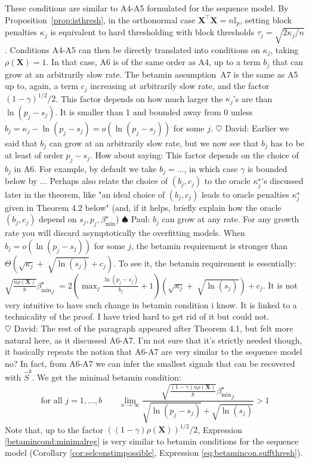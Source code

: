\documentclass[aos]{imsart}
\theoremstyle{plain}
\newcommand{\david}[1]{{\small{\color{blue} \sf $\heartsuit$ David: #1}}}
\newcommand{\paul}[1]{{\small{\color{green} \sf $\spadesuit$ Paul: #1}}}
\newcommand{\I}{\mathbb{I}}
\newcommand{\bs}{\boldsymbol}
\begin{document}
These conditions are similar to A4-A5 formulated for the sequence model.
 By Proposition~\ref{prop:isthresh}, in the orthonormal %
 case $\bs X^{\top}\bs X=n\I_p$, setting block penalties $\kappa_j$ %
 is equivalent to hard thresholding with block thresholds $\tau_j=\sqrt{2 \kappa_j/n}$.
 Conditions A4-A5 can then be directly translated into conditions on $\kappa_j$, taking $\rho(\bs X)=1$. In that case, A6 is of the same order as A4, up to a term $b_j$ that can grow at an arbitrarily slow rate. The betamin assumption~A7 is the same as A5 up to, again, a term $c_j$ increasing at arbitrarily slow rate, and the factor $(1-\gamma)^{1/2}/2$. This factor depends on how much larger the $\kappa_j$'s are than $\ln(p_j-s_j)$. It is smaller than 1 and bounded away from 0 unless $b_j= \kappa_j - \ln(p_j-s_j)= o(\ln(p_j-s_j))$ for some $j$.
\david{Earlier we said that $b_j$ can grow at an arbitrarily slow rate, but we now see that $b_j$ has to be at least of order $p_j-s_j$. How about saying: This factor depends on the choice of $b_j$ in A6. For example, by default we take $b_j=...$, in which case $\gamma$ is bounded below by ... Perhaps also relate the choice of $(b_j,c_j)$ to the oracle $\kappa_j^\star$'s discussed later in the theorem, like "an ideal choice of $(b_j,c_j)$ leads to oracle penalties $\kappa_j^\star$ given in Theorem 4.2 below" (and, if it helps, briefly explain how the oracle $(b_j,c_j)$ depend on $s_j,p_j,\beta_{\min}^\star$)} \paul{$b_j$ can grow at any rate.  For any growth rate you will discard asymptotically the overfitting models. When $b_j= o(\ln(p_j-s_j))$ for some $j$, the betamin requirement is stronger than $\Theta(\sqrt{\kappa_j} +\; \sqrt{\ln(s_j)} + c_{j})$. To see it, the betamin requirement is essentially: $\sqrt{\frac{ n\rho(\bs X)}{8}}{{\beta_{\min}^{\star}}_j}  \;=2(\max_j\frac{\ln(p_j-s_j)}{b_j}+1)(\sqrt{\kappa_j} +\; \sqrt{\ln(s_j)}) + c_{j}$. It is not very intuitive to have such change in betamin condition i know. It is linked to a technicality of the proof. I have tried hard to get rid of it but could not. \\}
\david{The rest of the paragraph appeared after Theorem 4.1, but felt more natural here, as it discussed A6-A7. I'm not sure that it's strictly needed though, it basically repeats the notion that A6-A7 are very similar to the sequence model no?} In fact, from A6-A7 we can infer the smallest signals that can be recovered with $\hat{S}^{b}$. %
We get the minimal betamin condition:
\begin{equation}\label{betamincond:minimalreg} \mbox{for all }j=1,\ldots,b \qquad
    \lim_{n\to \infty}\frac{\sqrt{\frac{(1-\gamma) n\rho(\bs X)}{8}}{\beta_{\min}^{\star}}_j}{\sqrt{\ln(p_j-s_j)} + \sqrt{\ln(s_j)}} >1
\end{equation}
Note that, up to the factor $((1-\gamma)\rho(\bs X))^{1/2}/2$, Expression \eqref{betamincond:minimalreg} is very similar to betamin conditions for the sequence model (Corollary \ref{cor:selconstimpossible}, Expression \eqref{eq:betamincon.suffthresh}).
\end{document}
